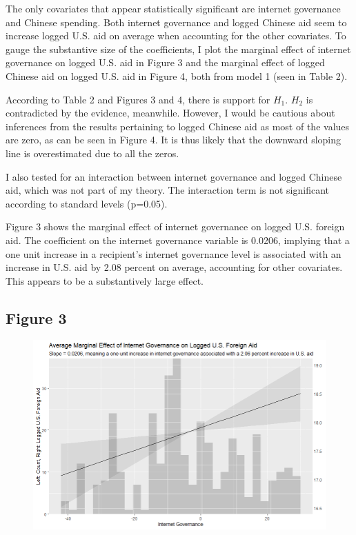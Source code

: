 \documentclass[12pt]{article}
\begin{document}
The only covariates that appear statistically significant are internet governance and Chinese spending. Both internet governance and logged Chinese aid seem to increase logged U.S. aid on average when accounting for the other covariates. To gauge the substantive size of the coefficients, I plot the marginal effect of internet governance on logged U.S. aid in Figure 3 and the marginal effect of logged Chinese aid on logged U.S. aid in Figure 4, both from model 1 (seen in Table 2).

According to Table 2 and Figures 3 and 4, there is support for $H_1$. $H_2$ is contradicted by the evidence, meanwhile. However, I would be cautious about inferences from the results pertaining to logged Chinese aid as most of the values are zero, as can be seen in Figure 4. It is thus likely that the downward sloping line is overestimated due to all the zeros.

I also tested for an interaction between internet governance and logged Chinese aid, which was not part of my theory. The interaction term is not significant according to standard levels (p=0.05).

\pagebreak
Figure 3 shows the marginal effect of internet governance on logged U.S. foreign aid. The coefficient on the internet governance variable is 0.0206, implying that a one unit increase in a recipient's internet governance level is associated with an increase in U.S. aid by 2.08 percent on average, accounting for other covariates. This appears to be a substantively large effect.

\subsection*{Figure 3}
\begin{figure}[htbp]
    \includegraphics[scale=0.7]{Figures/628plot1.png}
\end{figure}
\end{document}

